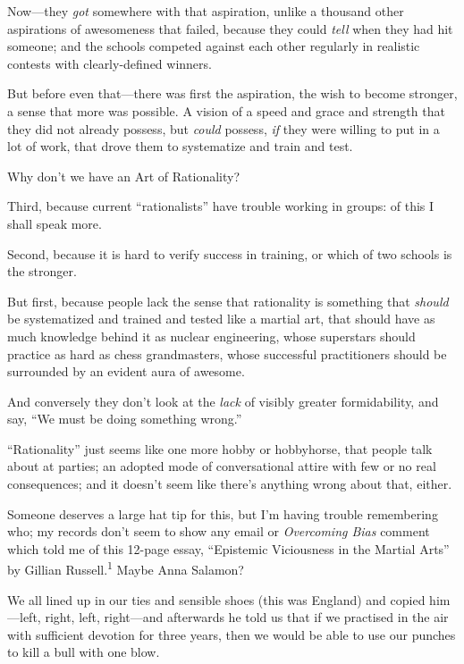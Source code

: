 {
 Now---they \textit{got} somewhere with that aspiration, unlike a
thousand other aspirations of awesomeness that failed, because they
could \textit{tell} when they had hit someone; and the schools competed
against each other regularly in realistic contests with clearly-defined
winners.}

{
 But before even that---there was first the aspiration, the wish to
become stronger, a sense that more was possible. A vision of a speed
and grace and strength that they did not already possess, but
\textit{could} possess, \textit{if} they were willing to put in a lot
of work, that drove them to systematize and train and test.}

{
 Why don't we have an Art of Rationality?}

{
 Third, because current
``rationalists'' have trouble
working in groups: of this I shall speak more.}

{
 Second, because it is hard to verify success in training, or which
of two schools is the stronger.}

{
 But first, because people lack the sense that rationality is
something that \textit{should} be systematized and trained and tested
like a martial art, that should have as much knowledge behind it as
nuclear engineering, whose superstars should practice as hard as chess
grandmasters, whose successful practitioners should be surrounded by an
evident aura of awesome.}

{
 And conversely they don't look at the
\textit{lack} of visibly greater formidability, and say,
``We must be doing something
wrong.''}

{
 ``Rationality'' just seems like
one more hobby or hobbyhorse, that people talk about at parties; an
adopted mode of conversational attire with few or no real consequences;
and it doesn't seem like there's
anything wrong about that, either.}

\myendsectiontext


{
 Someone deserves a large hat tip for this, but I'm
having trouble remembering who; my records don't seem
to show any email or \textit{Overcoming Bias} comment which told me of
this 12-page essay, ``Epistemic Viciousness in the
Martial Arts'' by Gillian Russell.\textsuperscript{1}
Maybe Anna Salamon?}

{
 We all lined up in our ties and sensible shoes (this was England)
and copied him---left, right, left, right---and afterwards he told us
that if we practised in the air with sufficient devotion for three
years, then we would be able to use our punches to kill a bull with one
blow.}

